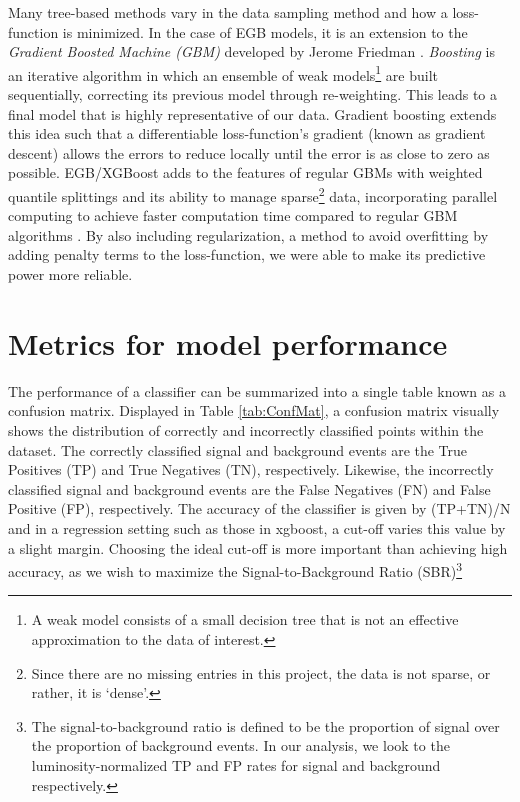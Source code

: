 Many tree-based methods vary in the data sampling method and how a loss-function is minimized. In the case of EGB models, it is an extension to the \textit{Gradient Boosted Machine (GBM)} developed by Jerome Friedman \cite{friedman2001greedy}. \textit{Boosting} is an iterative algorithm in which an ensemble of weak models\footnote{A weak model consists of a small decision tree that is not an effective approximation to the data of interest.} are built sequentially, correcting its previous model through re-weighting. This leads to a final model that is highly representative of our data. Gradient boosting extends this idea such that a differentiable loss-function's gradient (known as gradient descent) allows the errors to reduce locally until the error is as close to zero as possible. EGB/XGBoost adds to the features of regular GBMs with weighted quantile splittings and its ability to manage sparse\footnote{Since there are no missing entries in this project, the data is not sparse, or rather, it is `dense'.} data, incorporating parallel computing to achieve faster computation time compared to regular GBM algorithms \cite{chen2016xgboost}. By also including regularization, a method to avoid overfitting by adding penalty terms to the loss-function, we were able to make its predictive power more reliable. \\
\section{Metrics for model performance}
\label{sec:metrics}
The performance of a classifier can be summarized into a single table known as a confusion matrix. Displayed in Table \ref{tab:ConfMat}, a confusion matrix visually shows the distribution of correctly and incorrectly classified points within the dataset. The correctly classified signal and background events are the True Positives (TP) and True Negatives (TN), respectively. Likewise, the incorrectly classified signal and background events are the False Negatives (FN) and False Positive (FP), respectively. The accuracy of the classifier is given by (TP+TN)/N and in a regression setting such as those in xgboost, a cut-off varies this value by a slight margin. Choosing the ideal cut-off is more important than achieving high accuracy, as we wish to maximize the Signal-to-Background Ratio (SBR)\footnote{The signal-to-background ratio is defined to be the proportion of signal over the proportion of background events. In our analysis, we look to the luminosity-normalized TP and FP rates for signal and background respectively.}\\

